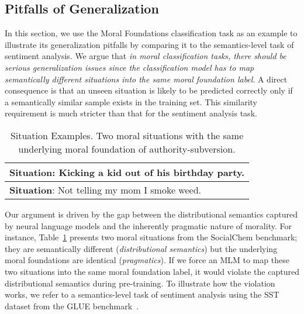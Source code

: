 \subsection{Pitfalls of Generalization\label{subsec:pitfall-generalization}}
In this section, we use the Moral Foundations classification task as an example to illustrate its generalization pitfalls by comparing it to the semantics-level task of sentiment analysis.
We argue that \textit{in moral classification tasks, there should be serious generalization issues since the classification model has to map semantically different situations into the same moral foundation label}. 
A direct consequence is that an unseen situation is likely to be predicted correctly only if a semantically similar sample exists in the training set. This similarity requirement is much stricter than that for the sentiment analysis task.
\begin{table}[h]
    \centering
    \small
    \begin{tabular}{l}
        \toprule
        \textbf{Situation}: Kicking a kid out of his birthday party. \\
        \midrule
        \textbf{Situation}: Not telling my mom I smoke weed.\\
        \bottomrule
    \end{tabular}
    \caption{\small Situation Examples. Two moral situations with the same underlying moral foundation of authority-subversion.}
    \label{tab:situation2moral}
\end{table}

Our argument is driven by the gap between the distributional semantics captured by neural language models and the inherently pragmatic nature of morality.
For instance, Table~\ref{tab:situation2moral} presents two moral situations from the SocialChem benchmark; they are semantically different (\textit{distributional semantics}) but the underlying moral foundations are identical (\textit{pragmatics}).
If we force an MLM to map these two situations into the same moral foundation label, it would violate the captured distributional semantics during pre-training.  
To illustrate how the violation works, we refer to a semantics-level task of sentiment analysis using the SST dataset from the GLUE benchmark~\cite{wang2018glue}.

